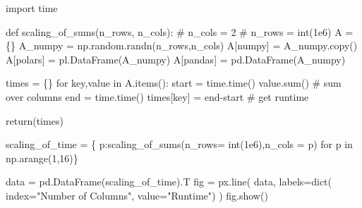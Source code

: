 \documentclass[
  letterpaper,
  DIV=11,
  numbers=noendperiod]{scrartcl}
\newenvironment{Shaded}{\begin{snugshade}}{\end{snugshade}}
\newcommand{\BuiltInTok}[1]{\textcolor[rgb]{0.00,0.23,0.31}{#1}}
\newcommand{\CommentTok}[1]{\textcolor[rgb]{0.37,0.37,0.37}{#1}}
\newcommand{\ControlFlowTok}[1]{\textcolor[rgb]{0.00,0.23,0.31}{#1}}
\newcommand{\DecValTok}[1]{\textcolor[rgb]{0.68,0.00,0.00}{#1}}
\newcommand{\FloatTok}[1]{\textcolor[rgb]{0.68,0.00,0.00}{#1}}
\newcommand{\ImportTok}[1]{\textcolor[rgb]{0.00,0.46,0.62}{#1}}
\newcommand{\KeywordTok}[1]{\textcolor[rgb]{0.00,0.23,0.31}{#1}}
\newcommand{\NormalTok}[1]{\textcolor[rgb]{0.00,0.23,0.31}{#1}}
\newcommand{\OperatorTok}[1]{\textcolor[rgb]{0.37,0.37,0.37}{#1}}
\newcommand{\StringTok}[1]{\textcolor[rgb]{0.13,0.47,0.30}{#1}}
\begin{document}
\begin{Shaded}
\begin{Highlighting}[]
\ImportTok{import}\NormalTok{ time}

\KeywordTok{def}\NormalTok{ scaling\_of\_sums(n\_rows, n\_cols):}
  \CommentTok{\# n\_cols = 2}
  \CommentTok{\# n\_rows = int(1e6)}
\NormalTok{  A }\OperatorTok{=}\NormalTok{ \{\}}
\NormalTok{  A\_numpy }\OperatorTok{=}\NormalTok{ np.random.randn(n\_rows,n\_cols)}
\NormalTok{  A[}\StringTok{\textquotesingle{}numpy\textquotesingle{}}\NormalTok{] }\OperatorTok{=}\NormalTok{ A\_numpy.copy()}
\NormalTok{  A[}\StringTok{\textquotesingle{}polars\textquotesingle{}}\NormalTok{] }\OperatorTok{=}\NormalTok{ pl.DataFrame(A\_numpy)}
\NormalTok{  A[}\StringTok{\textquotesingle{}pandas\textquotesingle{}}\NormalTok{] }\OperatorTok{=}\NormalTok{ pd.DataFrame(A\_numpy)}

\NormalTok{  times }\OperatorTok{=}\NormalTok{ \{\}}
  \ControlFlowTok{for}\NormalTok{ key,value }\KeywordTok{in}\NormalTok{ A.items():}
\NormalTok{    start }\OperatorTok{=}\NormalTok{ time.time() }
\NormalTok{    value.}\BuiltInTok{sum}\NormalTok{() }\CommentTok{\# sum over columns}
\NormalTok{    end }\OperatorTok{=}\NormalTok{ time.time()}
\NormalTok{    times[key] }\OperatorTok{=}\NormalTok{ end}\OperatorTok{{-}}\NormalTok{start }\CommentTok{\# get runtime}

  \ControlFlowTok{return}\NormalTok{(times)}
\end{Highlighting}
\end{Shaded}

\begin{Shaded}
\begin{Highlighting}[]
\NormalTok{scaling\_of\_time }\OperatorTok{=}\NormalTok{ \{}
\NormalTok{  p:scaling\_of\_sums(n\_rows}\OperatorTok{=} \BuiltInTok{int}\NormalTok{(}\FloatTok{1e6}\NormalTok{),n\_cols }\OperatorTok{=}\NormalTok{ p) }\ControlFlowTok{for}\NormalTok{ p }\KeywordTok{in}\NormalTok{ np.arange(}\DecValTok{1}\NormalTok{,}\DecValTok{16}\NormalTok{)\}}
\end{Highlighting}
\end{Shaded}

\begin{Shaded}
\begin{Highlighting}[]
\NormalTok{data }\OperatorTok{=}\NormalTok{ pd.DataFrame(scaling\_of\_time).T}
\NormalTok{fig }\OperatorTok{=}\NormalTok{ px.line(}
\NormalTok{  data, }
\NormalTok{  labels}\OperatorTok{=}\BuiltInTok{dict}\NormalTok{(}
\NormalTok{    index}\OperatorTok{=}\StringTok{"Number of Columns"}\NormalTok{, }
\NormalTok{    value}\OperatorTok{=}\StringTok{"Runtime"}\NormalTok{)}
\NormalTok{)}
\NormalTok{fig.show()}
\end{Highlighting}
\end{Shaded}
\end{document}
